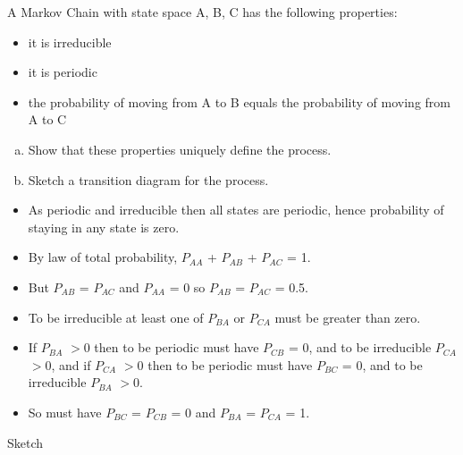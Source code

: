 \documentclass[a4paper,12pt]{article}
\begin{document}
\large
\noindent A Markov Chain with state space {A, B, C} has the following properties:
\begin{itemize}
\item it is irreducible
\item it is periodic
\item the probability of moving from A to B equals the probability of moving from A
to C
\end{itemize}

\begin{enumerate}[(a)]
\item  Show that these properties uniquely define the process.
\item  Sketch a transition diagram for the process.
\end{enumerate}
\bigskip
\newpage
\begin{itemize}
\item As periodic and irreducible then all states are periodic, hence
probability of staying in any state is zero.
\item By law of total probability, $P_{AA}$ + $P_{AB}$ + $P_{AC}$ = 1.
\item But $P_{AB}$ = $P_{AC}$ and $P_{AA}$ = 0 so $P_{AB}$ = $P_{AC}$ = 0.5.
\item To be irreducible at least one of $P_{BA}$ or $P_{CA}$ must be greater than zero.
\item If $P_{BA}$ $> 0$ then to be periodic must have $P_{CB}$ = 0,
and to be irreducible $P_{CA}$ $> 0$,
and if $P_{CA}$ $> 0$ then to be periodic must have $P_{BC}$ = 0, and to be
irreducible $P_{BA}$ $> 0$.
\item So must have $P_{BC}$ = $P_{CB}$ = 0 and $P_{BA}$ = $P_{CA}$ = 1.
\end{itemize}
\newpage
Sketch
\end{document}
